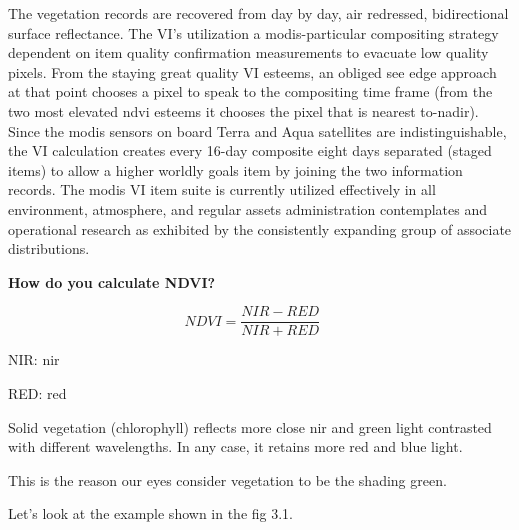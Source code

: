 The vegetation records are recovered from day by day, air redressed, bidirectional surface reflectance. The VI's utilization a \gls{modis}-particular compositing strategy dependent on item quality confirmation measurements to evacuate low quality pixels. From the staying great quality VI esteems, an obliged see edge approach at that point chooses a pixel to speak to the compositing time frame (from the two most elevated \gls{ndvi} esteems it chooses the pixel that is nearest to-nadir). Since the \gls{modis} sensors on board Terra and Aqua satellites are indistinguishable, the VI calculation creates every 16-day composite eight days separated (staged items) to allow a higher worldly goals item by joining the two information records. The \gls{modis} VI item suite is currently utilized effectively in all environment, atmosphere, and regular assets administration contemplates and operational research as exhibited by the consistently expanding group of associate distributions. \\

\centerline{\textbf{How do you calculate NDVI?}}

\textbf{\[ NDVI = \frac{NIR - RED}{NIR + RED} \ \ \ 
\ \ \]}

\centerline{NIR: \gls{nir}}
\centerline{RED: \gls{red}}

Solid vegetation (chlorophyll) reflects more close \gls{nir} and green light contrasted with different wavelengths. In any case, it retains more red and blue light. 

This is the reason our eyes consider vegetation to be the shading green.

Let's look at the example shown in the fig 3.1.

